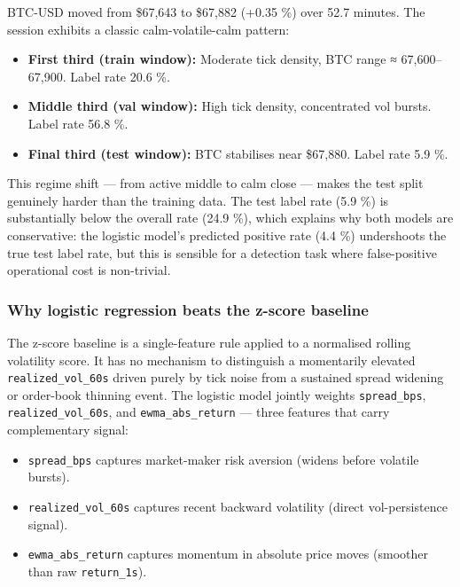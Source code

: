 \documentclass[
]{article}
\providecommand{\tightlist}{%
  \setlength{\itemsep}{0pt}\setlength{\parskip}{0pt}}
\begin{document}
BTC-USD moved from \$67,643 to \$67,882 (+0.35 \%) over 52.7 minutes.
The session exhibits a classic calm-volatile-calm pattern:

\begin{itemize}
\tightlist
\item
  \textbf{First third (train window):} Moderate tick density, BTC range
  ≈ 67,600--67,900. Label rate 20.6 \%.
\item
  \textbf{Middle third (val window):} High tick density, concentrated
  vol bursts. Label rate 56.8 \%.
\item
  \textbf{Final third (test window):} BTC stabilises near \$67,880.
  Label rate 5.9 \%.
\end{itemize}

This regime shift --- from active middle to calm close --- makes the
test split genuinely harder than the training data. The test label rate
(5.9 \%) is substantially below the overall rate (24.9 \%), which
explains why both models are conservative: the logistic model's
predicted positive rate (4.4 \%) undershoots the true test label rate,
but this is sensible for a detection task where false-positive
operational cost is non-trivial.

\hypertarget{why-logistic-regression-beats-the-z-score-baseline}{%
\subsubsection{Why logistic regression beats the z-score
baseline}\label{why-logistic-regression-beats-the-z-score-baseline}}

The z-score baseline is a single-feature rule applied to a normalised
rolling volatility score. It has no mechanism to distinguish a
momentarily elevated \texttt{realized\_vol\_60s} driven purely by tick
noise from a sustained spread widening or order-book thinning event. The
logistic model jointly weights \texttt{spread\_bps},
\texttt{realized\_vol\_60s}, and \texttt{ewma\_abs\_return} --- three
features that carry complementary signal:

\begin{itemize}
\tightlist
\item
  \texttt{spread\_bps} captures market-maker risk aversion (widens
  before volatile bursts).
\item
  \texttt{realized\_vol\_60s} captures recent backward volatility
  (direct vol-persistence signal).
\item
  \texttt{ewma\_abs\_return} captures momentum in absolute price moves
  (smoother than raw \texttt{return\_1s}).
\end{itemize}
\end{document}
